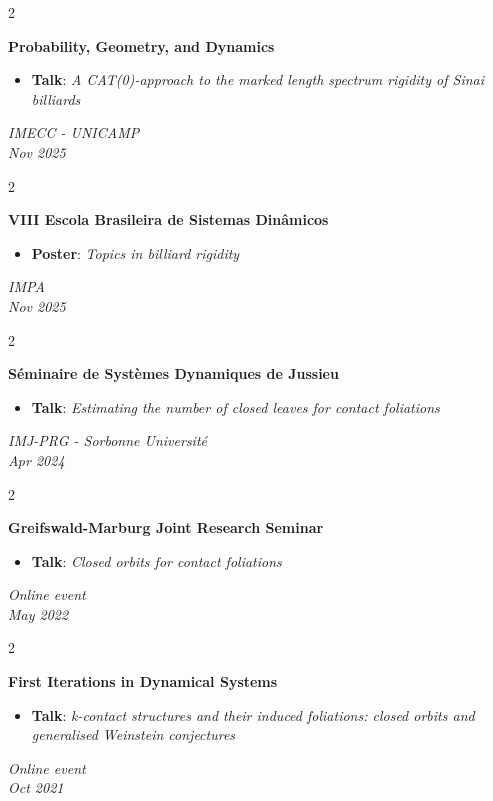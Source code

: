 \documentclass[10pt, letterpaper]{article}
\newenvironment{highlights}{
    \begin{itemize}[
        topsep=0.10 cm,
        parsep=0.10 cm,
        partopsep=0pt,
        itemsep=0pt,
        leftmargin=0.4 cm + 10pt
    ]
}{
    \end{itemize}
} %
\newenvironment{twocolentry}[2][]{
    \onecolentry
    \def\secondColumn{#2}
    \setcolumnwidth{\fill, 5 cm}
    \begin{paracol}{2}
    \small 
}{
    \switchcolumn \raggedleft \secondColumn
    \end{paracol}
    \endonecolentry
} %
\begin{document}
    \begin{twocolentry}{\textit{IMECC - UNICAMP \\ Nov 2025}}
            \textbf{Probability, Geometry, and Dynamics}
            \begin{highlights}
                \item \textbf{Talk}: \textit{A CAT(0)-approach to the marked length spectrum rigidity of Sinai billiards}
            \end{highlights}
        \end{twocolentry} \vspace{0.1cm}

        \begin{twocolentry}{\textit{IMPA \\ Nov 2025}}
            \textbf{VIII Escola Brasileira de Sistemas Dinâmicos}
            \begin{highlights}
                \item \textbf{Poster}: \textit{Topics in billiard rigidity}
            \end{highlights}
        \end{twocolentry} \vspace{0.1cm}

    \begin{twocolentry}{\textit{IMJ-PRG - Sorbonne Université \\ Apr 2024}}
        \textbf{Séminaire de Systèmes Dynamiques de Jussieu}
        \begin{highlights}
            \item \textbf{Talk}: \textit{Estimating the number of closed leaves for contact foliations}
        \end{highlights}
    \end{twocolentry} \vspace{0.1cm}
    
    \begin{twocolentry}{\textit{Online event \\ May 2022}}
        \textbf{Greifswald-Marburg Joint Research Seminar}
        \begin{highlights}
            \item \textbf{Talk}: \textit{Closed orbits for contact foliations}
        \end{highlights}
    \end{twocolentry} \vspace{0.1cm}
    
    \begin{twocolentry}{\textit{Online event \\ Oct 2021}}
        \textbf{First Iterations in Dynamical Systems}
        \begin{highlights}
            \item \textbf{Talk}: \textit{k-contact structures and their induced foliations: closed orbits and generalised Weinstein conjectures}
        \end{highlights}
    \end{twocolentry} \vspace{0.1cm}
    
\end{document}
